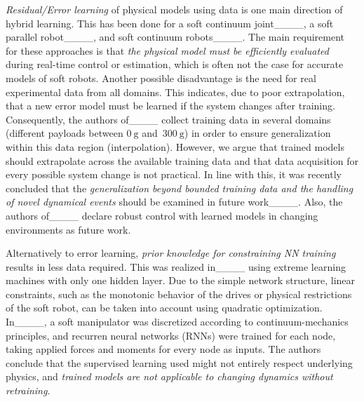\textit{Residual/Error learning} of physical models using data is one main direction of hybrid learning.
This has been done for a soft continuum joint____, a soft parallel robot____, and soft continuum robots____. 
The main requirement for these approaches is that \textit{the physical model must be efficiently evaluated} during real-time control or estimation, which is often not the case for accurate models of soft robots.
Another possible disadvantage is the need for real experimental data from all domains.
This indicates, due to poor extrapolation, that a new error model must be learned if the system changes after training. 
Consequently, the authors of____ collect training data in several domains (different payloads between $\SI{0}{\gram}$ and~$\SI{300}{\gram}$) in order to ensure generalization within this data region (interpolation).
However, we argue that trained models should extrapolate across the available training data and that data acquisition for every possible system change is not practical.
In line with this, it was recently concluded that the \textit{generalization beyond bounded training data and the handling of novel dynamical events} should be examined in future work____.
Also, the authors of____ declare robust control with learned models in changing environments as future work.

Alternatively to error learning, \textit{prior knowledge for constraining NN training} results in less data required. 
This was realized in____ using extreme learning machines with only one hidden layer. 
Due to the simple network structure, linear constraints, such as the monotonic behavior of the drives or physical restrictions of the soft robot, can be taken into account using quadratic optimization. 
In____, a soft manipulator was discretized according to continuum-mechanics principles, and recurren neural networks (RNNs) were trained for each node, taking applied forces and moments for every node as inputs. 
The authors conclude that the supervised learning used might not entirely respect underlying physics, and \textit{trained models are not applicable to changing dynamics without retraining}.

